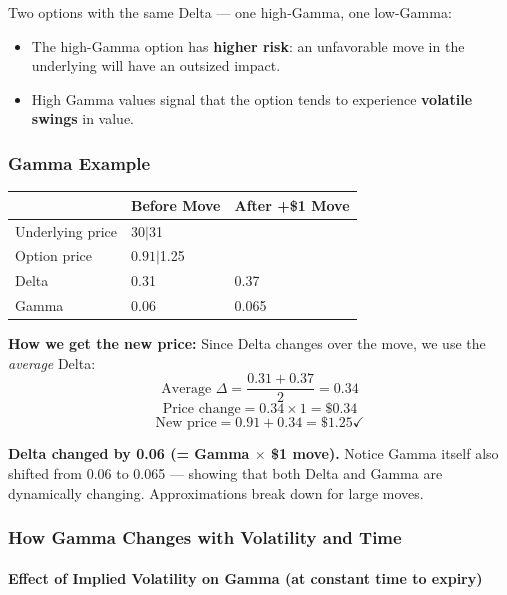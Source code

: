 \documentclass[12pt,openany]{book}
\begin{document}
Two options with the same Delta — one high-Gamma, one low-Gamma:
\begin{itemize}[leftmargin=*]
    \item The high-Gamma option has \textbf{higher risk}: an unfavorable move in the underlying will have an outsized impact.
    \item High Gamma values signal that the option tends to experience \textbf{volatile swings} in value.
\end{itemize}

\subsubsection{Gamma Example}

\begin{center}
\scriptsize
\setlength{\tabcolsep}{3pt}
\begin{tabular}{|L{4.1cm}|L{4.1cm}|L{4.1cm}|}
\hline
\textbf{} & \textbf{Before Move} & \textbf{After +\$1 Move} \\
\hline
Underlying price & \(30 | \)31 &  \\
\hline
Option price & \(0.91 | \)1.25 &  \\
\hline
Delta & 0.31 & 0.37 \\
\hline
Gamma & 0.06 & 0.065 \\
\hline
\end{tabular}
\end{center}

\textbf{How we get the new price:}
Since Delta changes over the move, we use the \emph{average} Delta:
\[
\text{Average } \Delta = \frac{0.31 + 0.37}{2} = 0.34
\]
\[
\text{Price change} = 0.34 \times 1 = \$0.34
\]
\[
\text{New price} = 0.91 + 0.34 = \$1.25 \checkmark
\]

\textbf{Delta changed by 0.06 (= Gamma \(\times\) \$1 move).} Notice Gamma itself also shifted from 0.06 to 0.065 — showing that both Delta and Gamma are dynamically changing. Approximations break down for large moves.

\subsubsection{How Gamma Changes with Volatility and Time}

\paragraph{Effect of Implied Volatility on Gamma (at constant time to expiry)}\par\noindent
\end{document}
